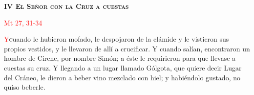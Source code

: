 \begin{center}
    \textbf{\textsc{IV El Señor con la Cruz a cuestas}}

    \textcolor{red}{Mt 27, 31-34}
\end{center}

\lettrine[lines=2]{\textcolor{red}{Y}} cuando le hubieron mofado, le despojaron de la clámide y le vistieron sus propios vestidos, y le llevaron de allí a crucificar.
Y cuando salían, encontraron un hombre de Cirene, por nombre Simón; a éste le requirieron para que llevase a cuestas su cruz. Y llegando a un lugar llamado Gólgota,
que quiere decir Lugar del Cráneo, le dieron a beber vino mezclado con hiel; y habiéndolo gustado, no quiso beberle.